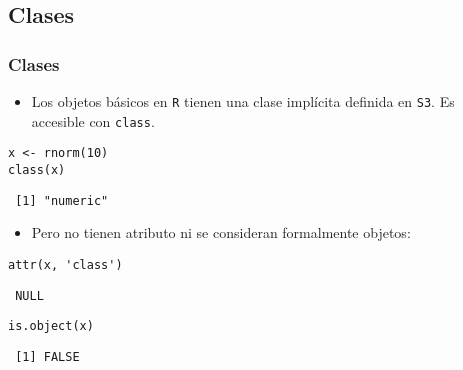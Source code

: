\documentclass[xcolor={usenames,svgnames,dvipsnames}]{beamer}
\begin{document}
\subsection{Clases}
\label{sec-2-1}
\begin{frame}[fragile]
\frametitle{Clases}
\label{sec-2-1-1}

\begin{itemize}
\item Los objetos básicos en \texttt{R} tienen una clase implícita definida en \texttt{S3}. Es accesible con \texttt{class}.
\end{itemize}

\lstset{language=R}
\begin{lstlisting}
x <- rnorm(10)
class(x)
\end{lstlisting}

\begin{verbatim}
 [1] "numeric"
\end{verbatim}

\begin{itemize}
\item Pero no tienen atributo ni se consideran formalmente objetos:
\end{itemize}

\lstset{language=R}
\begin{lstlisting}
attr(x, 'class')
\end{lstlisting}

\begin{verbatim}
 NULL
\end{verbatim}


\lstset{language=R}
\begin{lstlisting}
is.object(x)
\end{lstlisting}

\begin{verbatim}
 [1] FALSE
\end{verbatim}
\end{frame}
\end{document}

